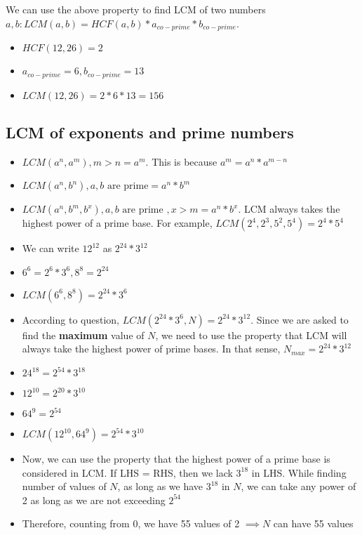 We can use the above property to find LCM of two numbers $a,b : LCM(a,b) = HCF(a,b) * a_{co-prime} * b_{co-prime}$.

\begin{itemize}
    \item $HCF(12,26) = 2$
    \item $a_{co-prime} = 6, b_{co-prime} = 13$
    \item $LCM(12,26) = 2 * 6 * 13 = 156$
\end{itemize}

\subsection{LCM of exponents and prime numbers}
\begin{itemize}
    \item $LCM(a^n,a^m), m > n = a^m$. This is because $a^m = a^n * a^{m-n}$
    \item $LCM(a^n,b^n), a,b \text{ are prime} = a^n * b^m$
    \item $LCM(a^n, b^m, b^x), a,b \text{ are prime }, x > m = a^n * b^x$. LCM always takes the highest power of a prime base. For example, $LCM(2^4,2^3,5^2,5^4) = 2^4 * 5^4$
\end{itemize}

\begin{itemize}
    \item We can write $12^{12}$ as $2^{24} * 3^{12}$
    \item $6^6 = 2^6 * 3^6, 8^8 = 2^{24}$
    \item $LCM(6^6,8^8) = 2^{24} * 3^6$
    \item According to question, $LCM(2^{24} * 3^6,N) = 2^{24} * 3^{12}$. Since we are asked to find the \textbf{maximum} value of $N$, we need to use the property that LCM will always take the highest power of prime bases. In that sense, $N_{max} = 2^{24} * 3^{12}$
\end{itemize}


\begin{itemize}
    \item $24^{18} = 2^{54} * 3^{18}$
    \item $12^{10} = 2^{20} * 3^{10}$
    \item $64^9 = 2^{54}$
    \item $LCM(12^{10},64^9) = 2^{54} * 3^{10}$
    \item Now, we can use the property that the highest power of a prime base is considered in LCM. If LHS = RHS, then we lack $3^{18}$ in LHS. While finding number of values of $N$, as long as we have $3^{18}$ in $N$, we can take any power of 2 as long as we are not exceeding $2^{54}$
    \item Therefore, counting from 0, we have 55 values of 2 $\implies N$ can have 55 values 
\end{itemize}

